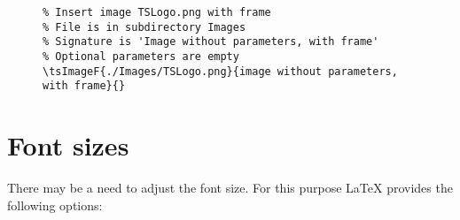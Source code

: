 
\begin{figure}[H]
    \scriptsize
    \centering
    \begin{BVerbatim}
\tsImageF{./Images/TSLogo.png}{image without parameters, with frame}{}
    \end{BVerbatim}
\end{figure}


\section{Font sizes}
\label{sec:Font sizes}

There may be a need to adjust the font size. For this purpose \LaTeX{} provides
the following options:


